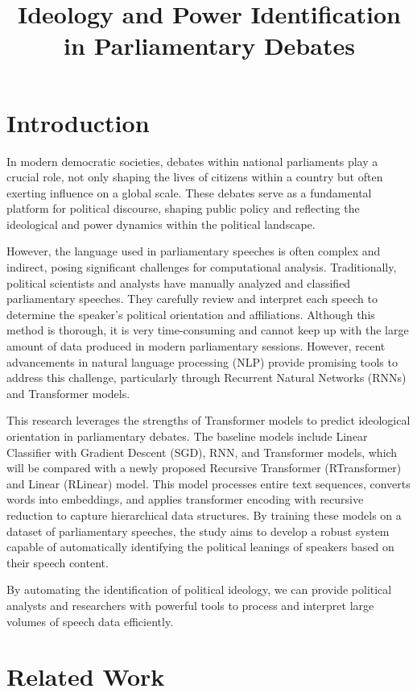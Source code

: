 \documentclass[10pt, a4paper]{article}
\title{Ideology and Power Identification in Parliamentary Debates}
\begin{document}
\maketitleabstract

\section{Introduction}

In modern democratic societies, debates within national parliaments play a crucial role, not only shaping the lives of citizens within a country but often exerting influence on a global scale. These debates serve as a fundamental platform for political discourse, shaping public policy and reflecting the ideological and power dynamics within the political landscape.

However, the language used in parliamentary speeches is often complex and indirect, posing significant challenges for computational analysis. Traditionally, political scientists and analysts have manually analyzed and classified parliamentary speeches. They carefully review and interpret each speech to determine the speaker's political orientation and affiliations. Although this method is thorough, it is very time-consuming and cannot keep up with the large amount of data produced in modern parliamentary sessions. However, recent advancements in natural language processing (NLP) provide promising tools to address this challenge, particularly through Recurrent Natural Networks (RNNs) and Transformer models. 

This research leverages the strengths of Transformer models to predict ideological orientation in parliamentary debates. The baseline models include Linear Classifier with Gradient Descent (SGD), RNN, and Transformer models, which will be compared with a newly proposed Recursive Transformer (RTransformer) and Linear (RLinear) model. This model processes entire text sequences, converts words into embeddings, and applies transformer encoding with recursive reduction to capture hierarchical data structures. By training these models on a dataset of parliamentary speeches, the study aims to develop a robust system capable of automatically identifying the political leanings of speakers based on their speech content.

By automating the identification of political ideology, we can provide political analysts and researchers with powerful tools to process and interpret large volumes of speech data efficiently.

\section{Related Work}
\end{document}
